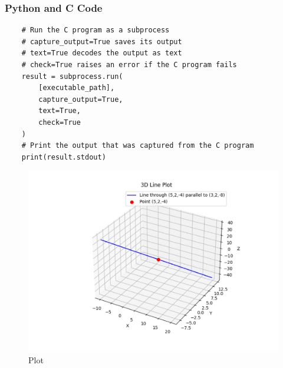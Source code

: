 \documentclass{beamer}
\begin{document}
\begin{frame}[fragile]
\frametitle{Python and C Code}
\begin{lstlisting}
    # Run the C program as a subprocess
    # capture_output=True saves its output
    # text=True decodes the output as text
    # check=True raises an error if the C program fails
    result = subprocess.run(
        [executable_path],
        capture_output=True,
        text=True,
        check=True
    )
    # Print the output that was captured from the C program
    print(result.stdout)
\end{lstlisting}
\end{frame}
\begin{frame}
\begin{figure}
    \centering
    \includegraphics[width=0.75\columnwidth]{line.jpg}
    \caption{Plot}
    \label{fig:Line}
\end{figure}
\end{frame}
\end{document}
